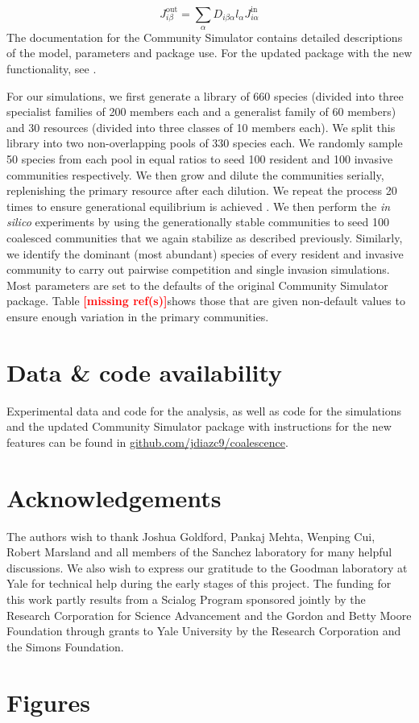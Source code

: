 \documentclass[a4paper,10pt]{article}
\newcommand{\mr}{\textcolor{red}{\textbf{[missing ref(s)]}}}
\begin{document}
\begin{equation}
J^{\mathrm{out}}_{i\beta} = \sum_\alpha D_{i\beta\alpha} l_\alpha J^{\mathrm{in}}_{i\alpha}
\label{eq:jout}
\end{equation}
%
The documentation for the Community Simulator contains detailed
descriptions of the model, parameters and package use. For the updated package with
the new functionality, see .

For our simulations,
we first generate a library of 660 species (divided into three specialist
families of 200 members each
and a generalist family of 60 members)
and 30 resources (divided into three classes of 10 members each).
We split this library into two non-overlapping pools of 330 species each.
We randomly sample 50 species from each pool in equal ratios to seed
100 resident and
100 invasive communities respectively.
We then grow and dilute the communities serially,
replenishing the primary
resource after each dilution.
We repeat the process 20 times to ensure generational equilibrium is
achieved \cite{Goldford2018}.
We then perform the \textit{in silico} experiments by using the
generationally stable communities to seed 100 coalesced communities
that we again stabilize as described previously.
Similarly, we identify the dominant (most
abundant) species of every resident and invasive community to carry out pairwise
competition and single invasion simulations.
Most parameters are set to the defaults of the original Community Simulator
package. Table \mr shows those that are given non-default values to ensure
enough variation in the primary communities.

\section*{Data \& code availability}\label{datacode}

Experimental data and code for the analysis, as well as code for the simulations
and the updated Community Simulator package with instructions for the
new features can be found in \url{github.com/jdiazc9/coalescence}.

\section*{Acknowledgements}

The authors wish to thank Joshua Goldford, Pankaj Mehta, Wenping Cui,
Robert Marsland and all members of the Sanchez laboratory
for many helpful discussions.
We also wish to express our gratitude to the Goodman laboratory at Yale
for technical help during the early stages of this project.
The funding for this work partly results from a Scialog Program
sponsored jointly by the Research Corporation for Science Advancement and
the Gordon and Betty Moore Foundation through grants to Yale University by the
Research Corporation and the Simons Foundation.

\clearpage

\section*{Figures}\label{figs}

\clearpage

%

\end{document}

